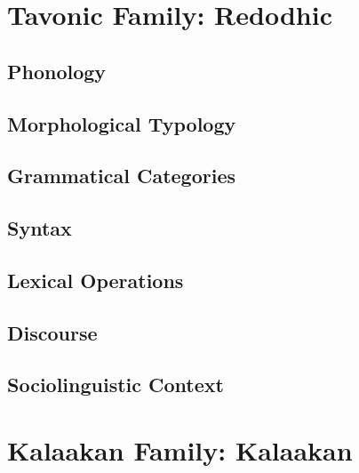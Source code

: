 \documentclass[12pt,letterpaper,openany,twoside]{memoir}
\let\originalpart=\part
\def\part{\cleardoublepage\originalpart}
\begin{document}


\part{Tavonic Family: Redodhic}



\chapter{Phonology}

\chapter{Morphological Typology}

\chapter{Grammatical Categories}

\chapter{Syntax}

\chapter{Lexical Operations}

\chapter{Discourse}

\chapter{Sociolinguistic Context}



\part{Kalaakan Family: Kalaakan}
\end{document}

